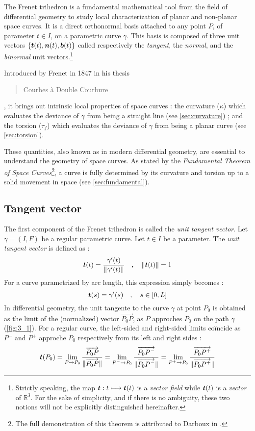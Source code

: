 The Frenet trihedron is a fundamental mathematical tool from the field of differential geometry to study local characterization of planar and non-planar space curves. It is a direct orthonormal basis attached to any point $P$, of parameter $t \in I$, on a parametric curve $\gamma$. This basis is composed of three unit vectors $\{\boldsymbol{t}(t),\boldsymbol{n}(t),\boldsymbol{b}(t)\}$ called respectively the \emph{tangent}, the \emph{normal}, and the \emph{binormal} unit vectors.\footnote{
Strictly speaking, the map $\boldsymbol{t} : t \longmapsto \boldsymbol{t}(t)$ is a \emph{vector field} while $\boldsymbol{t}(t)$ is a \emph{vector} of $\mathbb{R}^3$. For the sake of simplicity, and if there is no ambiguity, these two notions will not be explicitly distinguished hereinafter.}

Introduced by Frenet in 1847 in his thesis \blockcquote[]{Frenet1852}{Courbes à Double Courbure}, it brings out intrinsic local properties of space curves : the curvature ($\kappa$) which evaluates the deviance of $\gamma$ from being a straight line (see \cref{sec:curvature}) ; and the torsion ($\tau_f$) which evaluates the deviance of $\gamma$ from being a planar curve (see \cref{sec:torsion}).

These quantities, also known as  in modern differential geometry, are essential to understand the geometry of space curves. As stated by the \emph{Fundamental Theorem of Space Curves}\footnote{The full demonstration of this theorem is attributed to Darboux in \cite[p.11]{Delcourt2007}.}, a curve is fully determined by its curvature and torsion up to a solid movement in space (see \cref{sec:fundamental}).

\subsection{Tangent vector}
The first component of the Frenet trihedron is called the \emph{unit tangent vector}. 
Let $\gamma = (I,F)$ be a regular parametric curve. Let $t \in I$ be a parameter. The \emph{unit tangent vector} is defined as :
\begin{equation}
	\boldsymbol{t}(t) = \frac{\gamma'(t)}{\lVert\gamma'(t)\rVert}
	\quad,\quad
	\lVert\boldsymbol{t}(t)\rVert=1
\end{equation}
For a curve parametrized by arc length, this expression simply becomes :
\begin{equation}
	\boldsymbol{t}(s) = \gamma'(s)
	\quad,\quad
	s \in [0,L]
\end{equation}
In differential geometry, the unit tangente to the curve $\gamma$ at point $P_0$ is obtained as the limit of the (normalized) vector $\overrightarrow{P_0 P}$, as $P$ approches $P_0$ on the path $\gamma$ (\cref{fig:3_1}). For a regular curve, the left-sided and right-sided limits coïncide as $P^-$ and $P^+$ approche $P_0$ respectively from its left and right sides :
\begin{equation}
	\boldsymbol{t}(P_0)
	= \lim_{P \to P_0}\frac{\overrightarrow{P_0 P}}{\lVert\overrightarrow{P_0 P}\rVert}
	= \lim_{P^- \to P_0}\frac{\overrightarrow{P_0 P^-}}{\lVert\overrightarrow{P_0 P^-}\rVert}
	= \lim_{P^+ \to P_0}\frac{\overrightarrow{P_0 P^+}}{\lVert\overrightarrow{P_0 P^+}\rVert}
\label{eq:3_4}
\end{equation}

